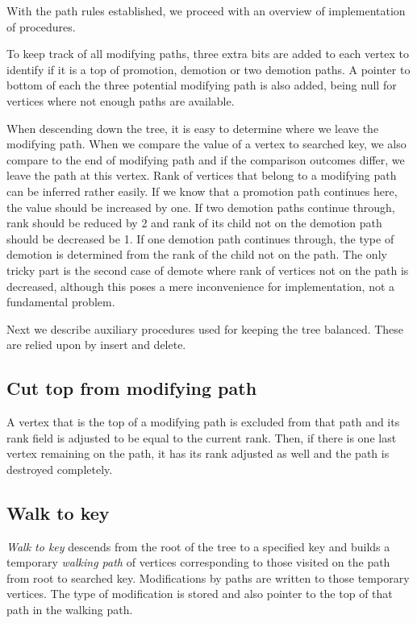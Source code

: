 With the path rules established, we proceed with an overview of implementation of procedures.

To keep track of all modifying paths, three extra bits are added to each vertex to identify if it is a top of promotion, demotion or two demotion paths. A pointer to bottom of each the three potential modifying path is also added, being null for vertices where not enough paths are available.

When descending down the tree, it is easy to determine where we leave the modifying path. When we compare the value of a vertex to searched key, we also compare to the end of modifying path and if the comparison outcomes differ, we leave the path at this vertex. Rank of vertices that belong to a modifying path can be inferred rather easily. If we know that a promotion path continues here, the value should be increased by one. If two demotion paths continue through, rank should be reduced by 2 and rank of its child not on the demotion path should be decreased be 1. If one demotion path continues through, the type of demotion is determined from the rank of the child not on the path. The only tricky part is the second case of demote where rank of vertices not on the path is decreased, although this poses a mere inconvenience for implementation, not a fundamental problem.

Next we describe auxiliary procedures used for keeping the tree balanced. These are relied upon by insert and delete.

\subsection{Cut top from modifying path}

A vertex that is the top of a modifying path is excluded from that path and its rank field is adjusted to be equal to the current rank. Then, if there is one last vertex remaining on the path, it has its rank adjusted as well and the path is destroyed completely.

\subsection{Walk to key}

\textit{Walk to key} descends from the root of the tree to a specified key and builds a temporary {\em walking path} of vertices corresponding to those visited on the path from root to searched key. Modifications by paths are written to those temporary vertices. The type of modification is stored and also pointer to the top of that path in the walking path.

